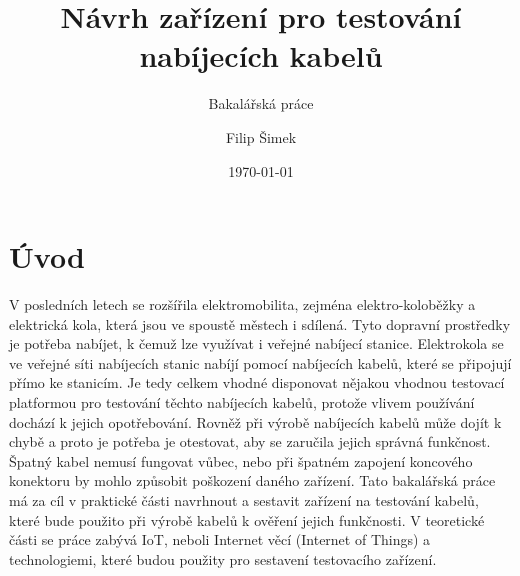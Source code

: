 \documentclass[12pt,a4paper,titlepage]{scrreprt}
\title{\vspace{6cm}Návrh zařízení pro testování nabíjecích kabelů}
\subtitle{Bakalářská práce}
\author{Filip Šimek}
\date{\today}
\makeatletter
\newcommand\thefontsize{(Font size = \f@size pt)}
\makeatother
\begin{document}
	
	
	
	\thispagestyle{empty}
	
	\thispagestyle{empty}
	
	\setcounter{page}{5}
	\newpage
	\thispagestyle{empty}
	
	
	\tableofcontents
	\thispagestyle{empty}
	
	\newpage
	\begin{minipage}{\textwidth}
 		\listoffigures
 		\thispagestyle{empty}
 		\listoftables
 		\thispagestyle{empty}
	\end{minipage}

	
	\chapter*{Úvod} %
V posledních letech se rozšířila elektromobilita, zejména elektro-koloběžky a elektrická kola, která jsou ve spoustě městech i sdílená. Tyto dopravní prostředky je potřeba nabíjet, k čemuž lze využívat i veřejné nabíjecí stanice. Elektrokola se ve veřejné síti nabíjecích stanic nabíjí pomocí nabíjecích kabelů, které se připojují přímo ke stanicím. Je tedy celkem vhodné disponovat nějakou vhodnou testovací platformou pro testování těchto nabíjecích kabelů, protože vlivem používání dochází k jejich opotřebování. Rovněž při výrobě nabíjecích kabelů může dojít k chybě a proto je potřeba je otestovat, aby se zaručila jejich správná funkčnost. Špatný kabel nemusí fungovat vůbec, nebo při špatném zapojení koncového konektoru by mohlo způsobit poškození daného zařízení. Tato bakalářská práce má za cíl v praktické části navrhnout a sestavit zařízení na testování kabelů, které bude použito při výrobě kabelů k ověření jejich funkčnosti. V teoretické části se práce zabývá IoT, neboli Internet věcí (Internet of Things) a technologiemi, které budou použity pro sestavení testovacího zařízení.
	\thispagestyle{empty}
	
\end{document}

